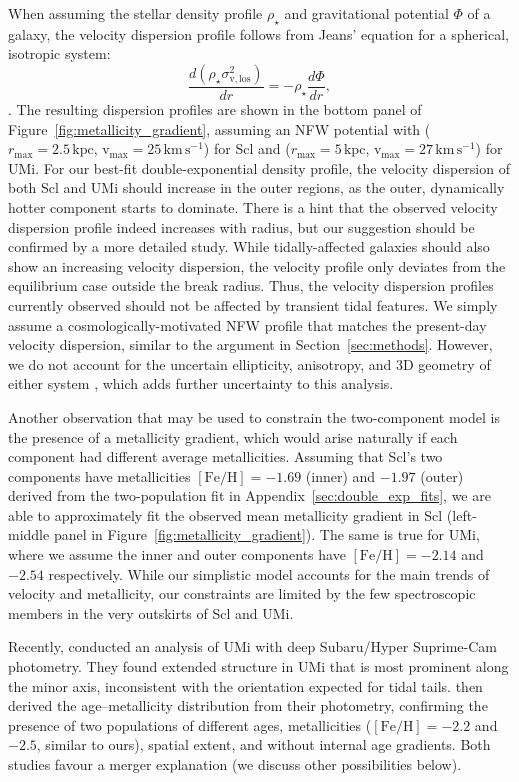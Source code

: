 \documentclass[linenumbers, twocolumn, twocolappendix]{aastex701}
\newcommand{\V}{\textrm{v}}
\newcommand{\vmax}{\V_\text{max}}
\newcommand{\rmax}{r_\text{max}}
\newcommand{\kpc}{\text{kpc}}
\newcommand{\kms}{\mathrm{km\,s^{-1}}}
\begin{document}
When assuming the stellar density profile $\rho_\star$ and gravitational potential $\Phi$ of a galaxy, the velocity dispersion profile follows from  Jeans' equation for a spherical, isotropic system:
\begin{equation}\label{eq:jeans}
    \frac{d(\rho_\star \sigma_{\V,\,\textrm{los}}^2)}{dr} = - \rho_\star \frac{d\Phi}{dr},
\end{equation}
\citep[section 4.2]{BT1987}.
The resulting dispersion profiles are shown in the bottom panel of Figure~\ref{fig:metallicity_gradient}, assuming an NFW potential with
($\rmax=2.5\,\kpc$, $\vmax=25\,\kms$) for Scl and ($\rmax=5\,\kpc$, $\vmax=27\,\kms$) for UMi.
For our best-fit double-exponential density profile, the velocity dispersion of both Scl and UMi should increase in the outer regions, as the outer, dynamically hotter component starts to dominate. There is a hint that the observed velocity dispersion profile indeed increases with radius, but our suggestion should be confirmed by a more detailed study. While tidally-affected galaxies should also show an increasing velocity dispersion, the velocity profile only deviates from the equilibrium case outside the break radius. Thus, the velocity dispersion profiles currently observed should not be affected by transient tidal features. We simply assume a cosmologically-motivated NFW profile that matches the present-day velocity dispersion, similar to the argument in Section~\ref{sec:methods}. However, we do not account for the uncertain ellipticity, anisotropy, and 3D geometry of either system \citep[e.g.,][]{vitral+2024, vitral+2026}, which adds further uncertainty to this analysis.


Another observation that may be used to constrain the two-component model is the presence of a metallicity gradient, which would arise naturally if each component had different average metallicities. Assuming that Scl's two components have metallicities $\mathrm{[Fe/H]}=-1.69$ (inner) and $-1.97$ (outer) derived from the two-population fit in Appendix~\ref{sec:double_exp_fits}, we are able to approximately fit the observed mean metallicity gradient in Scl (left-middle panel in Figure~\ref{fig:metallicity_gradient}). The same is true for UMi, where we assume the inner and outer components have $\mathrm{[Fe/H]} = -2.14$ and $-2.54$ respectively. While our simplistic model accounts for the main trends of velocity and metallicity, our constraints are limited by the few spectroscopic members in the very outskirts of Scl and UMi. 

Recently, \citet{sato+2025b, sato+2025c} conducted an analysis of UMi with deep Subaru/Hyper Suprime-Cam photometry.  
They found extended structure in UMi that is most prominent along the minor axis, inconsistent with the orientation expected for tidal tails. \citet{sato+2025c} then derived the age--metallicity distribution from their photometry, confirming the presence of two populations of different ages, metallicities ($\mathrm{[Fe/H]}=-2.2$ and $-2.5$, similar to ours), spatial extent, and without internal age gradients. Both studies favour a merger explanation (we discuss other possibilities below).
\end{document}
